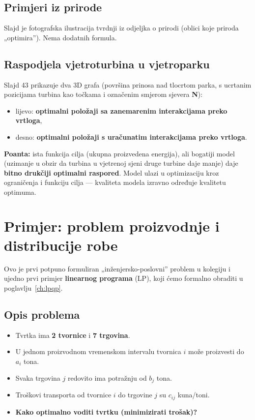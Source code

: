 \subsection{Primjeri iz prirode}

Slajd je fotografska ilustracija tvrdnji iz odjeljka o prirodi (oblici koje
priroda „optimira”). Nema dodatnih formula.

\subsection{Raspodjela vjetroturbina u vjetroparku}

Slajd 43 prikazuje dva 3D grafa (površina prinosa nad tlocrtom parka, s
ucrtanim pozicijama turbina kao točkama i označenim smjerom sjevera \textbf{N}):

\begin{itemize}
  \item lijevo: \textbf{optimalni položaji sa zanemarenim interakcijama preko
        vrtloga},
  \item desno: \textbf{optimalni položaji s uračunatim interakcijama preko
        vrtloga}.
\end{itemize}

\textbf{Poanta:} ista funkcija cilja (ukupna proizvedena energija), ali bogatiji
model (uzimanje u obzir da turbina u vjetrenoj sjeni druge turbine daje manje)
daje \textbf{bitno drukčiji optimalni raspored}. Model ulazi u optimizaciju
kroz ograničenja i funkciju cilja --- kvaliteta modela izravno određuje
kvalitetu optimuma.

\section{Primjer: problem proizvodnje i distribucije robe}
\label{sec:proizvodnja-distribucija}

Ovo je prvi potpuno formuliran „inženjersko-poslovni” problem u kolegiju i
ujedno prvi primjer \textbf{linearnog programa} (LP), koji ćemo formalno
obraditi u poglavlju~\ref{ch:lpqp}.

\subsection{Opis problema}

\begin{itemize}
  \item Tvrtka ima \textbf{2 tvornice} i \textbf{7 trgovina}.
  \item U jednom proizvodnom vremenskom intervalu tvornica $i$ može proizvesti
        do $a_i$ tona.
  \item Svaka trgovina $j$ redovito ima potražnju od $b_j$ tona.
  \item Troškovi transporta od tvornice $i$ do trgovine $j$ su $c_{ij}$
        kuna/toni.
  \item \textbf{Kako optimalno voditi tvrtku (minimizirati trošak)?}
\end{itemize}

